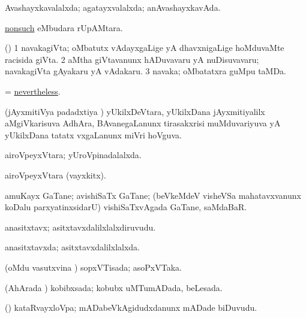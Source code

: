 \bentry
{}
\gl{\gu}
\bmng
Avashayxkavalalxda; agatayxvalalxda; anAvashayxkavAda. 
\emng
\eentry

\bentry
{}
\gl{\nA}
\bmng
\hyperlink{nonsuch}{nonsuch} eMbudara rUpAMtara. 
\emng
\eentry

\bentry
{}
\gl{\nA}
\bmng
(\saM) 
\bnum
\num{1} navakagiVta; oMbatutx vAdayxgaLige yA dhavxnigaLige hoMduvaMte racisida giVta. 
\num{2} aMtha giVtavanunx hADuvavaru yA nuDisuvavaru; navakagiVta gAyakaru yA vAdakaru. 
\num{3} navaka; oMbatatxra guMpu taMDa. 
\enum
\emng
\eentry

\bentry
{}
\gl{\kirxvi}
\bmng
= \hyperlink{nevertheless}{nevertheless}. 
\emng
\eentry

\bentry
{}
\gl{\gu}
\bmng
(jAyxmitiVya padadxtiya \vi) yUkilxDeVtara, yUkilxDana jAyxmitiyalilx aMgiVkarisuva AdhAra, BAvanegaLanunx tirasakxrisi muMduvariyuva yA yUkilxDana tatatx vxgaLanunx miVri hoVguva. 
\emng
\eentry

\bentry
{}
\gl{\gu}
\bmng
airoVpeyxVtara; yUroVpinadalalxda. 
\emng
\eentry

\bentry
{}
\gl{\nA}
\bmng
airoVpeyxVtara (vayxkitx). 
\emng
\eentry

\bentry
{}
\gl{\nA}
\bmng
amuKayx GaTane; avishiSaTx GaTane; (beVkeMdeV visheVSa mahatavxvanunx koDalu parxyatinxsidarU) vishiSaTxvAgada GaTane, saMdaBaR. 
\emng
\eentry

\bentry
{}
\gl{\nA}
\bmng
anasitxtavx; asitxtavxdalilxlalxdiruvudu. 
\emng
\eentry

\bentry
{}
\gl{\gu}
\bmng
anasitxtavxda; asitxtavxdalilxlalxda. 
\emng
\eentry

\bentry
{}
\gl{\gu}
\bmng
(oMdu vasutxvina \vi) sopxVTisada; asoPxVTaka. 
\emng
\eentry

\bentry
{}
\gl{\gu}
\bmng
(AhArada \vi) kobibxsada; kobubx uMTumADada, beLesada. 
\emng
\eentry

\bentry
{}
\gl{\nA}
\bmng
(\nAyxshA) kataRvayxloVpa; mADabeVkAgidudxdanunx mADade biDuvudu. 
\emng
\eentry

